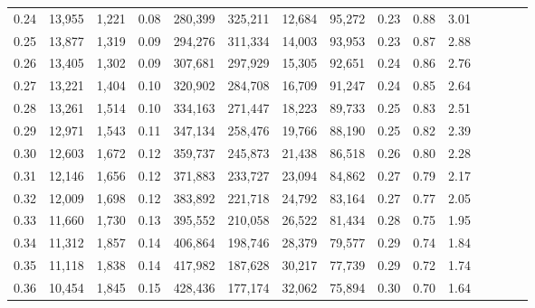 \begin{tabular}{rrrcrrrrrrrrrrr}
0.24 &  13,955 &  1,221 &                                       0.08 &  280,399 &  325,211 &   12,684 &   95,272 &  0.23 &  0.88 &                         3.01 \\
0.25 &  13,877 &  1,319 &                                       0.09 &  294,276 &  311,334 &   14,003 &   93,953 &  0.23 &  0.87 &                         2.88 \\
0.26 &  13,405 &  1,302 &                                       0.09 &  307,681 &  297,929 &   15,305 &   92,651 &  0.24 &  0.86 &                         2.76 \\
0.27 &  13,221 &  1,404 &                                       0.10 &  320,902 &  284,708 &   16,709 &   91,247 &  0.24 &  0.85 &                         2.64 \\
0.28 &  13,261 &  1,514 &                                       0.10 &  334,163 &  271,447 &   18,223 &   89,733 &  0.25 &  0.83 &                         2.51 \\
0.29 &  12,971 &  1,543 &                                       0.11 &  347,134 &  258,476 &   19,766 &   88,190 &  0.25 &  0.82 &                         2.39 \\
0.30 &  12,603 &  1,672 &                                       0.12 &  359,737 &  245,873 &   21,438 &   86,518 &  0.26 &  0.80 &                         2.28 \\
0.31 &  12,146 &  1,656 &                                       0.12 &  371,883 &  233,727 &   23,094 &   84,862 &  0.27 &  0.79 &                         2.17 \\
0.32 &  12,009 &  1,698 &                                       0.12 &  383,892 &  221,718 &   24,792 &   83,164 &  0.27 &  0.77 &                         2.05 \\
0.33 &  11,660 &  1,730 &                                       0.13 &  395,552 &  210,058 &   26,522 &   81,434 &  0.28 &  0.75 &                         1.95 \\
0.34 &  11,312 &  1,857 &                                       0.14 &  406,864 &  198,746 &   28,379 &   79,577 &  0.29 &  0.74 &                         1.84 \\
0.35 &  11,118 &  1,838 &                                       0.14 &  417,982 &  187,628 &   30,217 &   77,739 &  0.29 &  0.72 &                         1.74 \\
0.36 &  10,454 &  1,845 &                                       0.15 &  428,436 &  177,174 &   32,062 &   75,894 &  0.30 &  0.70 &                         1.64 \\

\end{tabular}
